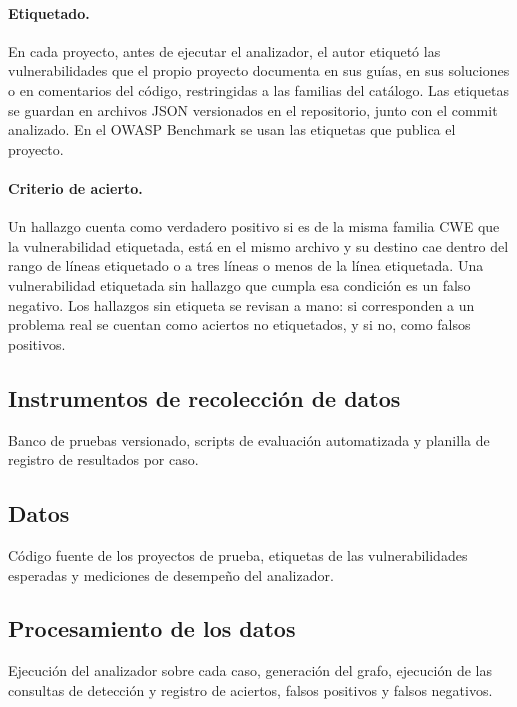 \paragraph{Etiquetado.} En cada proyecto, antes de ejecutar el analizador, el autor etiquetó las vulnerabilidades que el propio proyecto documenta en sus guías, en sus soluciones o en comentarios del código, restringidas a las familias del catálogo. Las etiquetas se guardan en archivos JSON versionados en el repositorio, junto con el commit analizado. En el OWASP Benchmark se usan las etiquetas que publica el proyecto.

\paragraph{Criterio de acierto.} Un hallazgo cuenta como verdadero positivo si es de la misma familia CWE que la vulnerabilidad etiquetada, está en el mismo archivo y su destino cae dentro del rango de líneas etiquetado o a tres líneas o menos de la línea etiquetada. Una vulnerabilidad etiquetada sin hallazgo que cumpla esa condición es un falso negativo. Los hallazgos sin etiqueta se revisan a mano: si corresponden a un problema real se cuentan como aciertos no etiquetados, y si no, como falsos positivos.

\subsection{Instrumentos de recolección de datos}\label{sec:n2.3.3}

Banco de pruebas versionado, scripts de evaluación automatizada y planilla de registro de resultados por caso.

\subsection{Datos}\label{sec:n2.3.4}

Código fuente de los proyectos de prueba, etiquetas de las vulnerabilidades esperadas y mediciones de desempeño del analizador.

\subsection{Procesamiento de los datos}\label{sec:n2.3.5}

Ejecución del analizador sobre cada caso, generación del grafo, ejecución de las consultas de detección y registro de aciertos, falsos positivos y falsos negativos.

